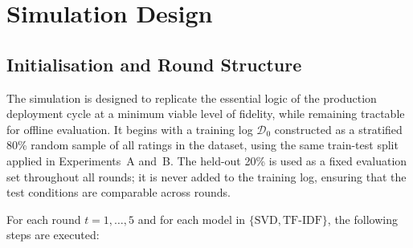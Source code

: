 \documentclass[11pt,a4paper]{report}
\begin{document}
\section{Simulation Design}
\label{sec:expc_design}

\subsection{Initialisation and Round Structure}

The simulation is designed to replicate the essential logic of the production deployment cycle at a minimum viable level of fidelity, while remaining tractable for offline evaluation. It begins with a training log $\mathcal{D}_0$ constructed as a stratified 80\% random sample of all ratings in the dataset, using the same train-test split applied in Experiments~A and~B. The held-out 20\% is used as a fixed evaluation set throughout all rounds; it is never added to the training log, ensuring that the test conditions are comparable across rounds.

For each round $t = 1, \ldots, 5$ and for each model in $\{\text{SVD}, \text{TF-IDF}\}$, the following steps are executed:
\end{document}
